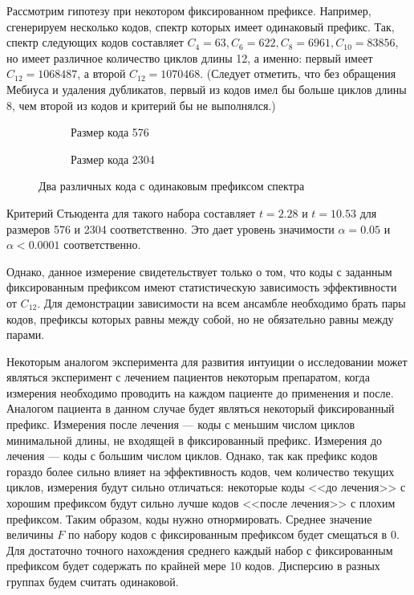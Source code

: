 Рассмотрим гипотезу при некотором фиксированном префиксе. Например, сгенерируем несколько кодов,
спектр которых имеет одинаковый префикс. Так, спектр следующих кодов составляет 
$C_4=63, C_6=622, C_8=6961, C_{10}=83856$, но имеет различное количество циклов
длины 12, а именно: первый имеет $C_{12}=1068487$, а второй $C_{12}=1070468$.  (Следует отметить, что без обращения Мебиуса и удаления дубликатов, первый из кодов имел бы больше
циклов длины 8, чем второй из кодов и критерий бы не выполнялся.)

\begin{figure}[h!]
\centering
\begin{subfigure}{.5\textwidth}
  \centering
  \caption{Размер кода 576}
\end{subfigure}%
\begin{subfigure}{.5\textwidth}
  \centering
  \caption{Размер кода 2304}
\end{subfigure}
\caption{Два различных кода с одинаковым префиксом спектра}
\end{figure}

Критерий Стьюдента для такого набора составляет $t=2.28$ и $t=10.53$ для размеров 576 и 2304 соответственно.
Это дает уровень значимости $\alpha=0.05$ и $\alpha<0.0001$ соответственно.

Однако, данное измерение свидетельствует только о том, что коды с заданным фиксированным префиксом
 имеют статистическую зависимость эффективности от $C_{12}$. Для демонстрации зависимости на всем
 ансамбле необходимо брать пары кодов, префиксы которых равны между собой, но не обязательно равны
 между парами. 
 
 Некоторым аналогом эксперимента для развития интуиции о исследовании может являться эксперимент
 с лечением пациентов некоторым препаратом, когда измерения необходимо проводить на каждом пациенте
 до применения и после. Аналогом пациента в данном случае будет являться некоторый фиксированный префикс.
 Измерения после лечения --- коды с меньшим числом циклов минимальной длины, не входящей в фиксированный
 префикс. Измерения до лечения --- коды с большим числом циклов. Однако, так как префикс кодов
 гораздо более сильно влияет на эффективность кодов, чем количество текущих циклов, измерения будут
 сильно отличаться: некоторые коды <<до лечения>> с хорошим префиксом будут сильно лучше кодов
 <<после лечения>> с плохим префиксом. Таким образом, коды нужно отнормировать. Среднее значение
 величины $F$ по набору кодов с фиксированным префиксом будет смещаться в 0. Для достаточно точного
 нахождения среднего каждый набор с фиксированным префиксом будет содержать по крайней мере 10
 кодов. Дисперсию в разных группах будем считать одинаковой.
 
